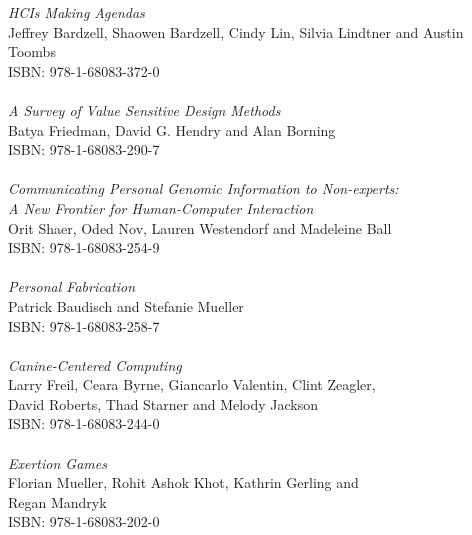 \vspace{12pt}
\noindent \textit{HCIs Making Agendas}\\
Jeffrey Bardzell, Shaowen Bardzell, Cindy Lin, Silvia Lindtner and Austin Toombs\\
ISBN: 978-1-68083-372-0\\
\\
\noindent \textit{A Survey of Value Sensitive Design Methods}\\
Batya Friedman, David G. Hendry and Alan Borning\\
ISBN: 978-1-68083-290-7\\
\\
\noindent \textit{Communicating Personal Genomic Information to Non-experts:\\ A New Frontier for Human-Computer Interaction}\\
Orit Shaer, Oded Nov, Lauren Westendorf and Madeleine Ball\\
ISBN: 978-1-68083-254-9\\
\\
\noindent \textit{Personal Fabrication}\\
Patrick Baudisch and Stefanie Mueller \\
ISBN: 978-1-68083-258-7\\
\\
\noindent \textit{Canine-Centered Computing}\\
Larry Freil, Ceara Byrne, Giancarlo Valentin, Clint Zeagler,\\ David Roberts, Thad Starner and Melody Jackson\\
ISBN: 978-1-68083-244-0\\
\\
\noindent \textit{Exertion Games}\\
Florian Mueller, Rohit Ashok Khot, Kathrin Gerling and\\ Regan Mandryk\\
ISBN: 978-1-68083-202-0
